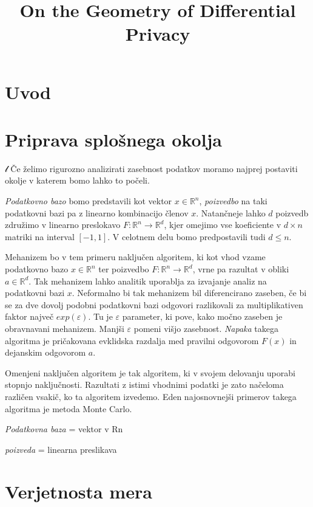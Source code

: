 \documentclass[mat1]{fmfdelo}
\title{On the Geometry of Differential Privacy}
\newcommand{\R}{\mathbb R}
\begin{document}
\section{Uvod}


\section{Priprava splošnega okolja}
$\mathcal{l}$
Če želimo rigurozno analizirati zasebnost podatkov moramo najprej postaviti okolje v katerem bomo lahko to počeli. \medskip

{\em Podatkovno bazo} bomo predstavili kot vektor $x \in \R^n$, {\em poizvedbo} na taki podatkovni bazi pa z linearno kombinacijo členov $x$. Natančneje lahko $d$ poizvedb združimo v linearno preslokavo $F: \R^n \to \R^d$, kjer omejimo vse koeficiente v $d \times n$ matriki na interval $[-1, 1]$. V celotnem delu bomo predpostavili tudi $d \leq n$. \medskip

Mehanizem bo v tem primeru naključen algoritem, ki kot vhod vzame podatkovno bazo $x \in \R^n$ ter poizvedbo $F: \R^n \to \R^d$, vrne pa razultat v obliki $a \in \R^d$. Tak mehanizem lahko analitik uporablja za izvajanje analiz na podatkovni bazi $x$. Neformalno bi tak mehanizem bil diferencirano zaseben, če bi se za dve dovolj podobni podatkovni bazi odgovori razlikovali za multiplikativen faktor največ $exp(\varepsilon)$. Tu je $\varepsilon$ parameter, ki pove, kako močno zaseben je obravnavani mehanizem. Manjši $\varepsilon$ pomeni višjo zasebnost. {\em Napaka} takega algoritma je pričakovana evklidska razdalja med pravilni odgovorom $F(x)$ in dejanskim odgovorom $a$. \medskip

Omenjeni naključen algoritem je tak algoritem, ki v svojem delovanju uporabi stopnjo naključnosti. Razultati z istimi vhodnimi podatki je zato načeloma različen vsakič, ko ta algoritem izvedemo. Eden najosnovnejši primerov takega algoritma je metoda Monte Carlo.

\begin{definicija}
	{\em Podatkovna baza} = vektor v Rn
\end{definicija}

\begin{definicija}
	{\em poizveda} = linearna preslikava
\end{definicija}

\section{Verjetnosta mera}
\end{document}
